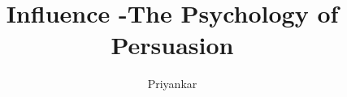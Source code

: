 \documentclass{notestyle}
\title{Influence -The Psychology of Persuasion}
\author{Priyankar}
\begin{document}
\maketitle
\tableofcontents
\clearpage










\nocite{*}
\end{document}
